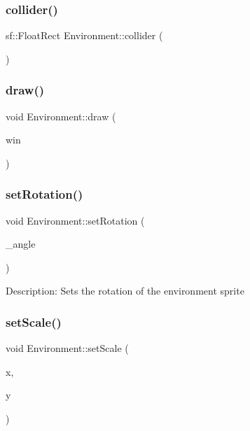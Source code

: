 \subsubsection{\texorpdfstring{collider()}{collider()}}
{\footnotesize\ttfamily sf\+::\+Float\+Rect Environment\+::collider (\begin{DoxyParamCaption}{ }\end{DoxyParamCaption})\hspace{0.3cm}{\ttfamily [inline]}}

\mbox{\label{class_environment_adfbdb91f7ab45252711cb6b0d499a40d}} 
\subsubsection{\texorpdfstring{draw()}{draw()}}
{\footnotesize\ttfamily void Environment\+::draw (\begin{DoxyParamCaption}\item[{sf\+::\+Render\+Window \&}]{win }\end{DoxyParamCaption})}

\mbox{\label{class_environment_a4615c9f3ea54f3365edd07c6dd92c612}} 
\subsubsection{\texorpdfstring{setRotation()}{setRotation()}}
{\footnotesize\ttfamily void Environment\+::set\+Rotation (\begin{DoxyParamCaption}\item[{float}]{\+\_\+angle }\end{DoxyParamCaption})}

Description\+: Sets the rotation of the environment sprite \mbox{\label{class_environment_adf58bfd600005d72d6fdb2c5236440dc}} 
\subsubsection{\texorpdfstring{setScale()}{setScale()}}
{\footnotesize\ttfamily void Environment\+::set\+Scale (\begin{DoxyParamCaption}\item[{float}]{x,  }\item[{float}]{y }\end{DoxyParamCaption})}

